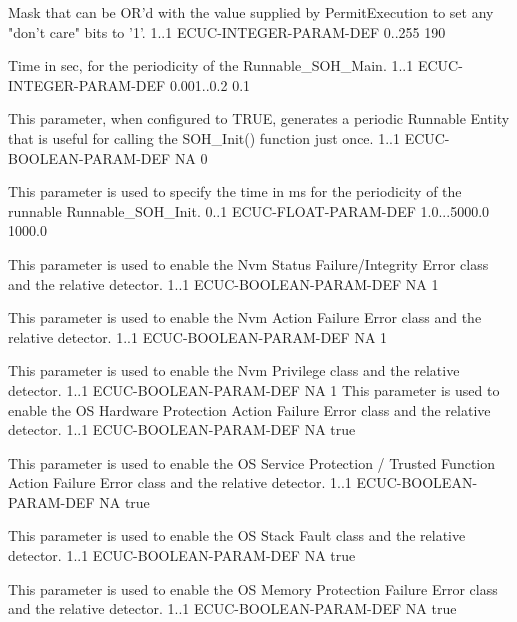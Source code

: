 {
	{Mask that can be OR'd with the value supplied by PermitExecution to set any "don't care" bits to '1'.}
	{1..1}
	{ECUC-INTEGER-PARAM-DEF}
	{0..255}
	{190}
}

{
	{Time in sec, for the periodicity of the Runnable_SOH_Main.}
	{1..1}
	{ECUC-INTEGER-PARAM-DEF}
	{0.001..0.2}
	{0.1}
}

{
	{This parameter, when configured to TRUE, generates a periodic Runnable Entity that is useful for calling the SOH_Init() function just once.}
	{1..1}
	{ECUC-BOOLEAN-PARAM-DEF}
	{NA}
	{0}
}

{
	{This parameter is used to specify the time in ms for the periodicity of the runnable Runnable_SOH_Init.}
	{0..1}
	{ECUC-FLOAT-PARAM-DEF}
	{1.0...5000.0}
	{1000.0}
}

{
	{This parameter is used to enable the Nvm Status Failure/Integrity Error class and the relative detector.}
	{1..1}
	{ECUC-BOOLEAN-PARAM-DEF}
	{NA}
	{1}
}

{
	{This parameter is used to enable the Nvm Action Failure Error class and the relative detector.}
	{1..1}
	{ECUC-BOOLEAN-PARAM-DEF}
	{NA}
	{1}
}

{
	{This parameter is used to enable the Nvm Privilege class and the relative detector.}
	{1..1}
	{ECUC-BOOLEAN-PARAM-DEF}
	{NA}
	{1}
}
{
    {This parameter is used to enable the OS Hardware Protection Action Failure Error class and the relative detector.}
    {1..1}
    {ECUC-BOOLEAN-PARAM-DEF}
    {NA}
    {true}
}


{
    {This parameter is used to enable the OS Service Protection / Trusted Function Action Failure Error class and the relative detector.}
    {1..1}
    {ECUC-BOOLEAN-PARAM-DEF}
    {NA}
    {true}
}

{
    {This parameter is used to enable the OS Stack Fault class and the relative detector.}
    {1..1}
    {ECUC-BOOLEAN-PARAM-DEF}
    {NA}
    {true}
}

{
    {This parameter is used to enable the OS Memory Protection Failure Error class and the relative detector.}
    {1..1}
    {ECUC-BOOLEAN-PARAM-DEF}
    {NA}
    {true}
}


